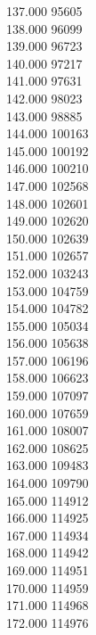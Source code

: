 { 137.000	95605 \\
 138.000	96099 \\
 139.000	96723 \\
 140.000	97217 \\
 141.000	97631 \\
 142.000	98023 \\
 143.000	98885 \\
 144.000	100163 \\
 145.000	100192 \\
 146.000	100210 \\
 147.000	102568 \\
 148.000	102601 \\
 149.000	102620 \\
 150.000	102639 \\
 151.000	102657 \\
 152.000	103243 \\
 153.000	104759 \\
 154.000	104782 \\
 155.000	105034 \\
 156.000	105638 \\
 157.000	106196 \\
 158.000	106623 \\
 159.000	107097 \\
 160.000	107659 \\
 161.000	108007 \\
 162.000	108625 \\
 163.000	109483 \\
 164.000	109790 \\
 165.000	114912 \\
 166.000	114925 \\
 167.000	114934 \\
 168.000	114942 \\
 169.000	114951 \\
 170.000	114959 \\
 171.000	114968 \\
 172.000	114976 \\
}
